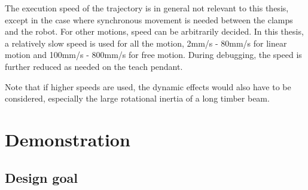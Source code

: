 The execution speed of the trajectory is in general not relevant to this thesis, except in the case where synchronous movement is needed between the clamps and the robot. For other motions, speed can be arbitrarily decided. In this thesis, a relatively slow speed is used for all the motion, 2mm/s - 80mm/s for linear motion and 100mm/s - 800mm/s for free motion. During debugging, the speed is further reduced as needed on the teach pendant. 

Note that if higher speeds are used, the dynamic effects would also have to be considered, especially the large rotational inertia of a long timber beam.

\section{Demonstration}
\label{section:exploration_2_demonstration}

\subsection{Design goal}
\label{subsection:exploration_2_design_goal}

